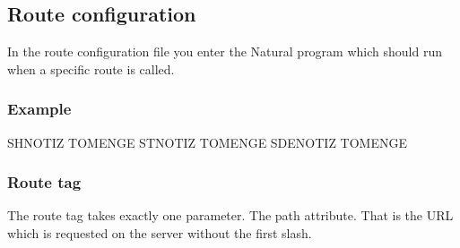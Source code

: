\documentclass[letterpaper,10pt,english]{sphinxmanual}
\begin{document}
\subsection{Route configuration}
\label{\detokenize{webserver:route-configuration}}
In the route configuration file you enter the Natural program which should run when a specific route is called.


\subsubsection{Example}
\label{\detokenize{webserver:id1}}
\begin{sphinxVerbatim}[commandchars=\\\{\}]
     
        SHNOTIZ
        TOMENGE
     
        STNOTIZ
        TOMENGE
     
        SDENOTIZ
        TOMENGE
\end{sphinxVerbatim}


\subsubsection{Route tag}
\label{\detokenize{webserver:route-tag}}
The route tag takes exactly one parameter. The path attribute. That is the URL which is requested on the server without the first slash.
\end{document}
